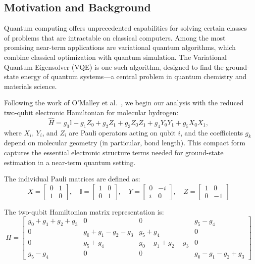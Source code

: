 \documentclass[
	a4paper,
	12pt,
	oneside,
]{article}
\begin{document}
\subsection{Motivation and Background}

Quantum computing offers unprecedented capabilities for solving certain classes of problems that are intractable on classical computers. Among the most promising near-term applications are variational quantum algorithms, which combine classical optimization with quantum simulation. The Variational Quantum Eigensolver (VQE) is one such algorithm, designed to find the ground-state energy of quantum systems—a central problem in quantum chemistry and materials science.

Following the work of O'Malley et al.~\cite{omalley2016scalable}, we begin our analysis with the reduced two-qubit electronic Hamiltonian for molecular hydrogen:
\begin{equation}
\hat{H} = g_0 \mathbb{I} + g_1 Z_0 + g_2 Z_1 + g_3 Z_0 Z_1 + g_4 Y_0 Y_1 + g_5 X_0 X_1,
\label{eq:omalley_hamiltonian}
\end{equation}
where $X_i$, $Y_i$, and $Z_i$ are Pauli operators acting on qubit $i$, and the coefficients $g_k$ depend on molecular geometry (in particular, bond length). This compact form captures the essential electronic structure terms needed for ground-state estimation in a near-term quantum setting.

The individual Pauli matrices are defined as:
\[
X = \begin{bmatrix}
	0 & 1 \\
	1 & 0
\end{bmatrix}, \quad
\mathbb{I} = \begin{bmatrix}
	1 & 0 \\
	0 & 1
\end{bmatrix}, \quad
Y = \begin{bmatrix}
	0 & -i \\
	i & 0
\end{bmatrix}, \quad
Z = \begin{bmatrix}
	1 & 0 \\
	0 & -1
\end{bmatrix}
\]

The two-qubit Hamiltonian matrix representation is:
\[
H = \begin{bmatrix}
	g_0 + g_1 + g_2 + g_3 & 0 & 0 & g_5 - g_4 \\
	0 & g_0 + g_1 - g_2 - g_3 & g_5 + g_4 & 0 \\
	0 & g_5 + g_4 & g_0 - g_1 + g_2 - g_3 & 0 \\
	g_5 - g_4 & 0 & 0 & g_0 - g_1 - g_2 + g_3
\end{bmatrix}
\]
\end{document}
